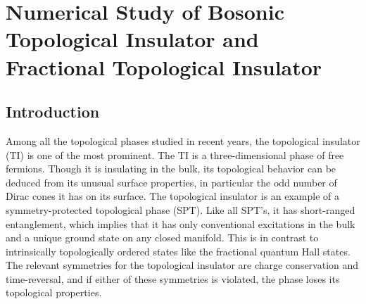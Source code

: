 \chapter{Numerical Study of Bosonic Topological Insulator and Fractional Topological Insulator}
\label{chapter::SO34D}

\section{Introduction}
Among all the topological phases studied in recent years, the topological insulator (TI) is one of the most prominent.\cite{KaneHasanRMP,QiZhangRMP} The TI is a three-dimensional phase of free fermions. Though it is insulating in the bulk, its topological behavior can be deduced from its unusual surface properties, in particular the odd number of Dirac cones it has on its surface. The topological insulator is an example of a symmetry-protected topological phase (SPT).  Like all SPT's, it has short-ranged entanglement, which implies that it has only conventional excitations in the bulk and a unique ground state on any closed manifold. This is in contrast to intrinsically topologically ordered states like the fractional quantum Hall states. The relevant symmetries for the topological insulator are charge conservation and time-reversal, and if either of these symmetries is violated, the phase loses its topological properties.

